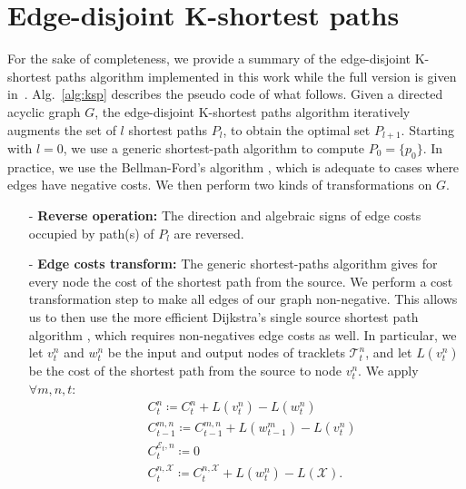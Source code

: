 \appendix
\section{Edge-disjoint K-shortest paths}
\label{sec:ksp}

For the sake of completeness, we provide a summary of the edge-disjoint K-shortest paths algorithm implemented in this work while the full version is given in~\cite{suurballe74}.
Alg.~\ref{alg:ksp} describes the pseudo code of what follows.
Given a directed acyclic graph $G$, the edge-disjoint K-shortest paths algorithm iteratively augments the set of $l$ shortest paths $P_{l}$, to obtain the optimal set $P_{l+1}$. Starting with $l=0$, we use a generic shortest-path algorithm to compute $P_0=\{p_0\}$.
In practice, we use the Bellman-Ford's algorithm \cite{bellman58}, which is adequate to cases where edges have negative costs. We then perform two kinds of transformations on $G$.

\begin{itemize}
\item[-]  {\bf{Reverse operation:}} The direction and algebraic signs of edge costs occupied by path(s) of $P_{l}$ are reversed.
\item[-] {\bf{Edge costs transform:}}
The generic shortest-paths algorithm gives for every node the cost of the shortest path from the source. We perform a cost transformation step to make all edges of our graph non-negative. This allows us to then use the more efficient Dijkstra's single source shortest path algorithm \cite{dijkstra59}, which requires non-negatives edge costs as well.
In particular, we let $v_t^n$ and $w_t^n$ be the input and output nodes of tracklets $\mathcal{T}_t^n$, and let $L(v_t^n)$ be the cost of the shortest path from the source to node $v_t^n$. We apply $\forall m,n,t$:
\begin{subequations}
\label{eq:cost_transform}
\begin{align}
&C_t^{n} \coloneqq C_t^n + L(v_t^n) - L(w_t^n)\label{eq:cost_transform_tracklet}\\
&C_{t-1}^{m,n} \coloneqq C_{t-1}^{m,n} + L(w_{t-1}^m) - L(v_{t}^n)\label{eq:cost_transform_transition}\\
&C_t^{\mathcal{E}_t,n} \coloneqq 0 \label{eq:cost_transform_entrance}\\
&C_t^{n,\mathcal{X}} \coloneqq C_t^{n,\mathcal{X}} + L(w_t^n) - L(\mathcal{X}). \label{eq:cost_transform_sink}
\end{align}
\end{subequations}
\end{itemize}

